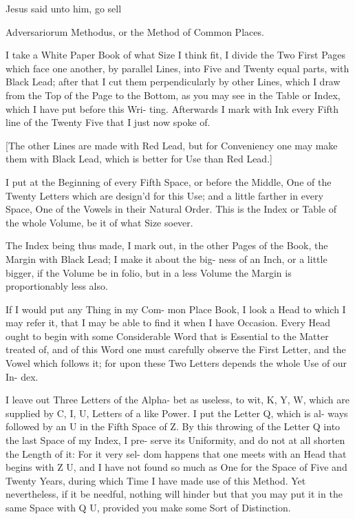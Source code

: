 Jesus said unto him, go sell

Adversariorum Methodus, or the Method of Common Places.

I take a White Paper Book of what
Size I think fit, I divide the Two First
Pages which face one another, by parallel
Lines, into Five and Twenty equal parts,
with Black Lead; after that I cut them
perpendicularly by other Lines, which I
draw from the Top of the Page to the
Bottom, as you may see in the Table or
Index, which I have put before this Wri-
ting. Afterwards I mark with Ink every
Fifth line of the Twenty Five that I just
now spoke of.

[The other Lines are made with Red
Lead, but for Conveniency one may make
them with Black Lead, which is better for
Use than Red Lead.]

I put at the Beginning of every Fifth
Space, or before the Middle, One of the
Twenty Letters which are design'd for this
Use; and a little farther in every Space,
One of the Vowels in their Natural Order.
This is the Index or Table of the whole
Volume, be it of what Size soever.

The Index being thus made, I mark out,
in the other Pages of the Book, the Margin
with Black Lead; I make it about the big-
ness of an Inch, or a little bigger, if the
Volume be in folio, but in a less Volume
the Margin is proportionably less also.

If I would put any Thing in my Com-
mon Place Book, I look a Head to which
I may refer it, that I may be able to find
it when I have Occasion. Every Head
ought to begin with some Considerable
Word that is Essential to the Matter treated
of, and of this Word one must carefully
observe the First Letter, and the Vowel
which follows it; for upon these Two
Letters depends the whole Use of our In-
dex.

I leave out Three Letters of the Alpha-
bet as useless, to wit, K, Y, W, which
are supplied by C, I, U, Letters of a like
Power. I put the Letter Q, which is al-
ways followed by an U in the Fifth Space
of Z. By this throwing of the Letter
Q into the last Space of my Index, I pre-
serve its Uniformity, and do not at all
shorten the Length of it: For it very sel-
dom happens that one meets with an Head
that begins with Z U, and I have not
found so much as One for the Space of
Five and Twenty Years, during which
Time I have made use of this Method.
Yet nevertheless, if it be needful, nothing
will hinder but that you may put it in the
same Space with Q U, provided you make
some Sort of Distinction.


